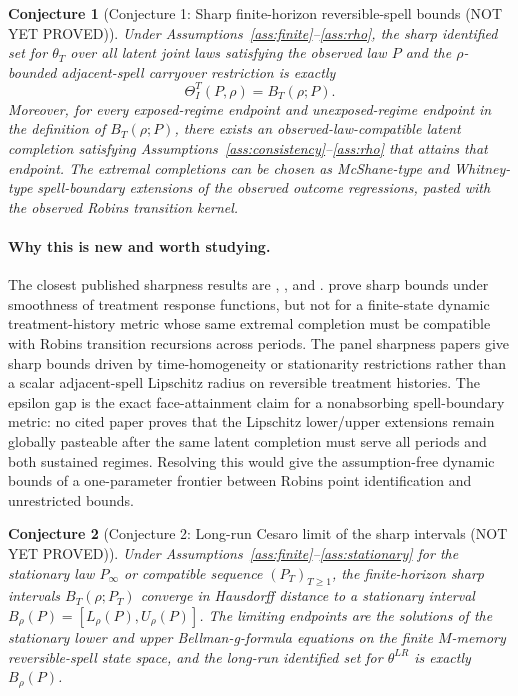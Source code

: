 \documentclass[11pt]{article}
\theoremstyle{definition}
\theoremstyle{plain}
\newtheorem{conjecture}{Conjecture}
\theoremstyle{remark}
\begin{document}
\begin{conjecture}[Conjecture 1: Sharp finite-horizon reversible-spell bounds (NOT YET PROVED)]\label{conj:sharp-finite}
Under Assumptions~\ref{ass:finite}--\ref{ass:rho}, the sharp identified set for
\(\theta_T\) over all latent joint laws satisfying the observed law \(P\) and
the \(\rho\)-bounded adjacent-spell carryover restriction is exactly
\[
\Theta_I^T(P,\rho)=B_T(\rho;P).
\]
Moreover, for every exposed-regime endpoint and unexposed-regime endpoint in
the definition of \(B_T(\rho;P)\), there exists an observed-law-compatible
latent completion satisfying Assumptions~\ref{ass:consistency}--\ref{ass:rho}
that attains that endpoint.  The extremal completions can be chosen as
McShane-type and Whitney-type spell-boundary extensions of the observed
outcome regressions, pasted with the observed Robins transition kernel.
\end{conjecture}
\paragraph{Why this is new and worth studying.}
The closest published sharpness results are
\citet{KimKwonKwonLee2018}, \citet{ChernozhukovFernandezValHahnNewey2013}, and
\citet{JunLeeShin2016}.  \citet{KimKwonKwonLee2018} prove sharp bounds under
smoothness of treatment response functions, but not for a finite-state dynamic
treatment-history metric whose same extremal completion must be compatible with
Robins transition recursions across periods.  The panel sharpness papers give
sharp bounds driven by time-homogeneity or stationarity restrictions rather
than a scalar adjacent-spell Lipschitz radius on reversible treatment histories.
The epsilon gap is the exact face-attainment claim for a nonabsorbing
spell-boundary metric: no cited paper proves that the Lipschitz lower/upper
extensions remain globally pasteable after the same latent completion must
serve all periods and both sustained regimes.  Resolving this would give the
assumption-free dynamic bounds of \citet{DiemerShiSwanson2024} a one-parameter
frontier between Robins point identification and unrestricted bounds.

\begin{conjecture}[Conjecture 2: Long-run Cesaro limit of the sharp intervals (NOT YET PROVED)]\label{conj:longrun}
Under Assumptions~\ref{ass:finite}--\ref{ass:stationary} for the stationary law
\(P_\infty\) or compatible sequence \((P_T)_{T\ge1}\), the finite-horizon
sharp intervals \(B_T(\rho;P_T)\) converge in Hausdorff distance to a stationary
interval \(B_\rho(P)=[L_\rho(P),U_\rho(P)]\).  The limiting endpoints are the
solutions of the stationary lower and upper Bellman-g-formula equations on the
finite \(M\)-memory reversible-spell state space, and the long-run identified
set for \(\theta^{LR}\) is exactly \(B_\rho(P)\).
\end{conjecture}
\end{document}
